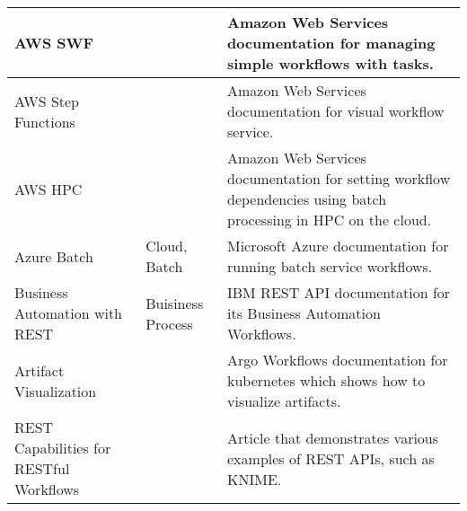 \begin{table*}[htb]
{{\begin{tabular}{|p{3cm}|p{1.5cm}|p{10cm}|}
AWS SWF \cite{www-aws-swf} & & Amazon Web Services documentation for managing simple workflows with tasks. \\
\hline

AWS Step Functions \cite{www-aws-stepfunctions} & & Amazon Web Services documentation for visual workflow service. \\
\hline

AWS HPC  \cite{www-aws-batch-workflow} & & Amazon Web Services documentation for setting workflow dependencies using batch processing in HPC on the cloud. \\
\hline

Azure Batch \cite{www-azure-batch} & Cloud, Batch & Microsoft Azure documentation for running batch service workflows. \\
  \hline

 Business Automation with REST \cite{www-business-rest-ibm} & Buisiness
                                        Process& IBM REST API documentation for its Business Automation Workflows. \\
\hline

  
  Artifact Visualization \cite{www-artifact} & & Argo Workflows documentation for kubernetes which shows how to visualize artifacts. \\
\hline

REST Capabilities for RESTful Workflows \cite{www-rest-workflows} & & Article that demonstrates various examples of REST APIs, such as KNIME. \\
\hline


\end{tabular}
}
}
\end{table*}
